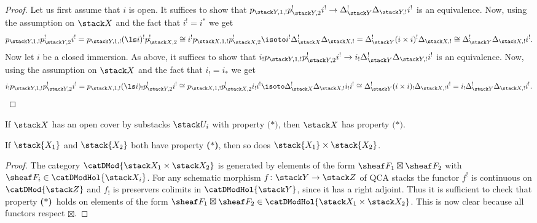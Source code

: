 \documentclass{ck-article}
\newcommand\bc{\textbf{($\mathbf{*}$)}}
\begin{document}
\begin{proof}
    Let us first assume that $i$ is open.
    It suffices to show that $p_{\stack Y,1,!}p_{\stack Y,2}^!i^! \to \Delta_{\stack Y}^!\Delta_{\stack Y,!}i^!$ is an equivalence.
    Now, using the assumption on $\stack X$ and the fact that $i^! = i^*$ we get
    \[
        p_{\stack Y,1,!} p_{\stack Y,2}^!i^! =
        p_{\stack Y,1,!} (\ls i)^! p_{\stack X,2}^! \cong
        i^! p_{\stack X,1,!} p_{\stack X,2}^! \isoto
        i^! \Delta_{\stack X}^! \Delta_{\stack X,!} =
        \Delta_{\stack Y}^! (i\times i)^! \Delta_{\stack X,!} \cong
        \Delta_{\stack Y}^! \Delta_{\stack X,!} i^!.
    \]
    Now let $i$ be a closed immersion.
    As above, it suffices to show that $i_!p_{\stack Y,1,!}p_{\stack Y,2}^!i^! \to i_!\Delta_{\stack Y}^!\Delta_{\stack Y,!}i^!$ is an equivalence.
    Now, using the assumption on $\stack X$ and the fact that $i_! = i_*$ we get
    \[
        i_! p_{\stack Y,1,!} p_{\stack Y,2}^!i^! =
        p_{\stack X,1,!} (\ls i)_! p_{\stack Y,2}^!i^! \cong
        p_{\stack X,1,!} p_{\stack X,2}^! i_!i^! \isoto
        \Delta_{\stack X}^! \Delta_{\stack X,!} i_!i^! \cong
        \Delta_{\stack Y}^! (i\times i)_! \Delta_{\stack X,!}i^! =
        i_! \Delta_{\stack Y}^! \Delta_{\stack X,!} i^!.
        \qedhere
    \]

\end{proof}

\begin{Lem}\label{lem:bc_open_cover}
    If $\stack X$ has an open cover by substacks $\stack U_i$ with property $\bc$, then $\stack X$ has property $\bc$.
\end{Lem}

\begin{Lem}\label{lem:bc_product}
    If $\stack{X_1}$ and $\stack{X_2}$ both have property \bc, then so does $\stack{X_1} \times \stack{X_2}$.
\end{Lem}

\begin{proof}
    The category $\catDMod{\stack X_1 \times \stack X_2}$ is generated by elements of the form $\sheaf F_1 \boxtimes \sheaf F_2$ with $\sheaf F_i \in \catDModHol{\stack X_i}$.
    For any schematic morphism $f\colon \stack Y \to \stack Z$ of QCA stacks the functor $f^!$ is continuous on $\catDMod{\stack Z}$ and $f_!$ is preservers colimits in $\catDModHol{\stack Y}$, since it has a right adjoint.
    Thus it is sufficient to check that property \bc\ holds on elements of the form $\sheaf F_1 \boxtimes \sheaf F_2 \in \catDModHol{\stack X_1 \times \stack X_2}$.
    This is now clear because all functors respect $\boxtimes$.
\end{proof}
\end{document}
